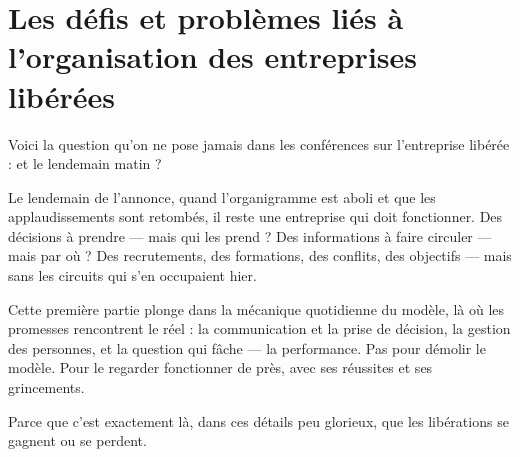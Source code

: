 \part{Les défis et problèmes liés à l'organisation des entreprises libérées}

Voici la question qu'on ne pose jamais dans les conférences sur l'entreprise libérée : et le lendemain matin ?

Le lendemain de l'annonce, quand l'organigramme est aboli et que les applaudissements sont retombés, il reste une entreprise qui doit fonctionner. Des décisions à prendre — mais qui les prend ? Des informations à faire circuler — mais par où ? Des recrutements, des formations, des conflits, des objectifs — mais sans les circuits qui s'en occupaient hier.

Cette première partie plonge dans la mécanique quotidienne du modèle, là où les promesses rencontrent le réel : la communication et la prise de décision, la gestion des personnes, et la question qui fâche — la performance. Pas pour démolir le modèle. Pour le regarder fonctionner de près, avec ses réussites et ses grincements.

Parce que c'est exactement là, dans ces détails peu glorieux, que les libérations se gagnent ou se perdent.
